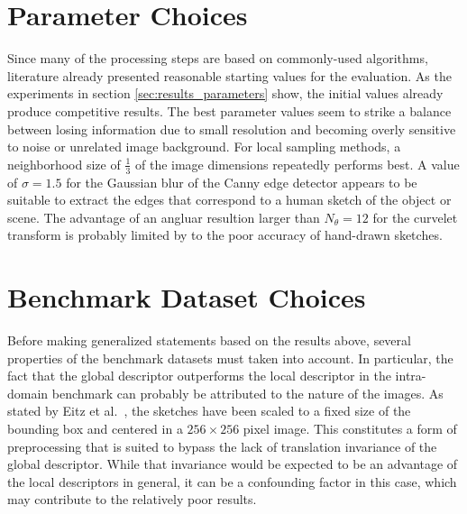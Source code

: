 \section{Parameter Choices}

Since many of the processing steps are based on commonly-used algorithms,
literature already presented reasonable starting values for the evaluation. As
the experiments in section \ref{sec:results_parameters} show, the initial
values already produce competitive results. The best parameter values seem to
strike a balance between losing information due to small resolution and
becoming overly sensitive to noise or unrelated image background. For local
sampling methods, a neighborhood size of $\frac{1}{3}$ of the image dimensions
repeatedly performs best. A value of $\sigma=1.5$ for the Gaussian blur of the
Canny edge detector appears to be suitable to extract the edges that correspond
to a human sketch of the object or scene. The advantage of an angluar resultion
larger than $N_{\theta}=12$ for the curvelet transform is probably limited by
to the poor accuracy of hand-drawn sketches.

\section{Benchmark Dataset Choices}

Before making generalized statements based on the results above, several
properties of the benchmark datasets must taken into account. In particular,
the fact that the global descriptor outperforms the local descriptor in the
intra-domain benchmark can probably be attributed to the nature of the images.
As stated by Eitz et al.\ \autocite{eitz_how_2012}, the sketches have been
scaled to a fixed size of the bounding box and centered in a $256 \times 256$
pixel image. This constitutes a form of preprocessing that is suited to bypass
the lack of translation invariance of the global descriptor. While that
invariance would be expected to be an advantage of the local descriptors in
general, it can be a confounding factor in this case, which may contribute to
the relatively poor results.


